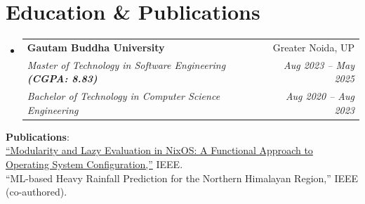 \documentclass[letterpaper,12pt]{article}
\makeatletter
\newcommand{\resumeSubheadingCollege}[6]{
  \vspace{0pt}\item
    \begin{tabular*}{0.97\textwidth}[t]{l@{\extracolsep{\fill}}r}
      \textbf{#1} & #2 \\
      \textit{\small#3} & \textit{\small #4} \\
      \textit{\small#5} & \textit{\small #6} \\
    \end{tabular*}\vspace{-4pt}
}
\newcommand{\resumeSubHeadingListStart}{\begin{itemize}[leftmargin=0.15in, label={}]}
\newcommand{\resumeSubHeadingListEnd}{\end{itemize}}
\makeatother
\begin{document}
\section{Education \& Publications}
\vspace{-4pt}
\resumeSubHeadingListStart
\resumeSubheadingCollege
{Gautam Buddha University}{Greater Noida, UP}
{Master of Technology in Software Engineering \textbf{(CGPA: 8.83)}}{Aug 2023 -- May 2025}
{Bachelor of Technology in Computer Science Engineering}{Aug 2020 -- Aug 2023}
\resumeSubHeadingListEnd
\vspace{-2pt}
\begin{itemize}[leftmargin=0.15in, label={}, nosep, topsep=0pt, itemsep=0pt, parsep=0pt]
\small{\item{
\textbf{Publications}{:} \\
\href{https://ieeexplore.ieee.org/document/10991248}{``Modularity and Lazy Evaluation in NixOS: A Functional Approach to Operating System Configuration,''} IEEE. \\
``ML-based Heavy Rainfall Prediction for the Northern Himalayan Region,'' IEEE (co-authored).
}}
\end{itemize}
\end{document}
